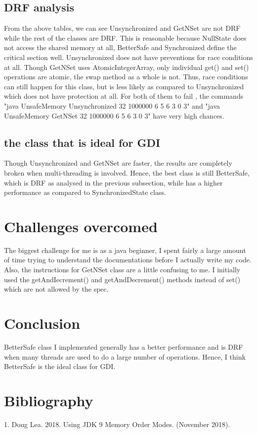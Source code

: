 \documentclass[letterpaper,twocolumn,10pt]{article}
\begin{document}
\subsection{DRF analysis}
From the above tables, we can see Unsynchronized and GetNSet are not DRF while the rest of the classes are DRF. This is reasonable because NullState does not access the shared memory at all, BetterSafe and Synchronized define the critical section well. Unsynchronized does not have preventions for race conditions at all. Though GetNSet uses AtomicIntegerArray, only individual get() and set() operations are atomic, the swap method as a whole is not. Thus, race conditions can still happen for this class, but is less likely as compared to Unsynchronized which does not have protection at all. For both of them to fail , the commands "java UnsafeMemory Unsynchronized 32 1000000 6 5 6 3 0 3" and "java UnsafeMemory GetNSet 32 1000000 6 5 6 3 0 3" have very high chances.

\subsection{the class that is ideal for GDI}
Though Unsynchronized and GetNSet are faster, the results are completely broken when multi-threading is involved. Hence, the best class is still BetterSafe, which is DRF as analysed in the previous subsection, while has a higher performance as compared to SynchronizedState class.

\section{Challenges overcomed}
The biggest challenge for me is as a java beginner, I spent fairly a large amount of time trying to understand the documentations before I actually write my code. Also, the instructions for GetNSet class are a little confusing to me. I initially used the getAndIecrement() and getAndDecrement() methods instead of set() which are not allowed by the spec.
\section{Conclusion}
BetterSafe class I implemented generally has a better performance and is DRF when many threads are used to do a large number of operations. Hence, I think BetterSafe is the ideal class for GDI.
\section{Bibliography}
1. Doug Lea. 2018. Using JDK 9 Memory Order Modes. (November 2018).


\end{document}
